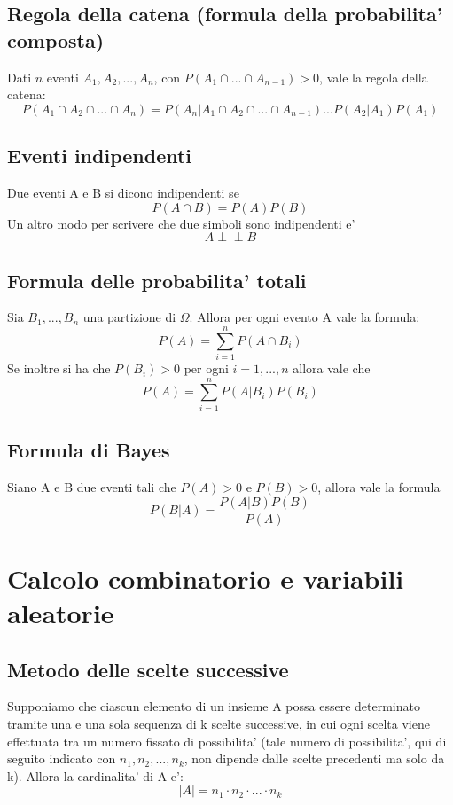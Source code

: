 \documentclass{article}
\newcommand{\ind}{\perp\!\!\!\!\!\!\perp}
\begin{document}
\subsection{Regola della catena (formula della probabilita' composta)}
Dati $n$ eventi $A_1, A_2,..., A_n$, con $P(A_1 \cap ... \cap A_{n - 1}) > 0$, vale la regola
della catena:\newline
$$P(A_1 \cap A_2 \cap ... \cap A_{n}) = P(A_n|A_1 \cap A_2 \cap ... \cap A_{n - 1}) ... P(A_2|A_1)P(A_1)$$

\subsection{Eventi indipendenti}
Due eventi A e B si dicono indipendenti se \newline
$$ P(A \cap B) = P(A)P(B)$$\newline
Un altro modo per scrivere che due simboli sono indipendenti e'\newline
$$ A \ind B $$

\subsection{Formula delle probabilita' totali}
Sia $B_1,...,B_n$ una partizione di $\Omega$. Allora per ogni evento A vale la formula:\newline
$$ P(A) = \sum_{i=1}^{n}P(A\cap B_i)$$\newline
Se inoltre si ha che $P(B_i) > 0$ per ogni $i = 1,...,n$ allora vale che\newline
$$ P(A) = \sum_{i=1}^n P(A|B_i)P(B_i)$$

\subsection{Formula di Bayes}
Siano A e B due eventi tali che $P(A)>0$ e $P(B)>0$, allora vale la formula \newline
$$ P(B|A) = \frac{P(A|B)P(B)}{P(A)}$$

\newpage

\section{Calcolo combinatorio e variabili aleatorie}
\subsection{Metodo delle scelte successive}
Supponiamo che ciascun elemento di un insieme A possa essere determinato tramite una e una sola sequenza di k scelte successive, in cui ogni scelta viene effettuata tra un numero fissato di possibilita' (tale numero di possibilita', qui di seguito indicato con $n_1, n_2,..., n_k$, non dipende dalle scelte precedenti ma solo da k).\newline
Allora la cardinalita' di A e':\newline
$$ |A| = n_1 \cdot n_2 \cdot ... \cdot n_k$$
\end{document}
